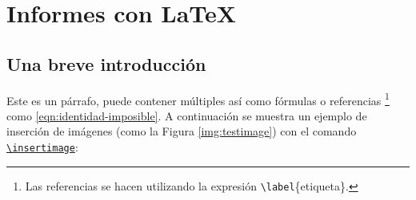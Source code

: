 %
%

\section{Informes con \LaTeX}

	\subsection{Una breve introducción}
		
		Este es un párrafo, puede contener múltiples  así como fórmulas o referencias \footnote{Las referencias se hacen utilizando la expresión \texttt{\textbackslash label}\{etiqueta\}.} como \eqref{eqn:identidad-imposible}. A continuación se muestra un ejemplo de inserción de imágenes (como la Figura \ref{img:testimage}) con el comando \href{https://latex.ppizarror.com/informe.html#hlp-imagen}{\texttt{\textbackslash insertimage}}:


